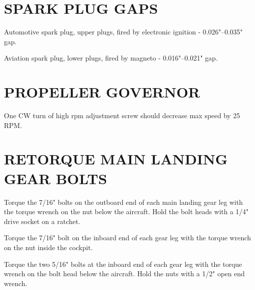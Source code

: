 \section{SPARK PLUG GAPS}
Automotive spark plug, upper plugs, fired by electronic ignition - 0.026"--0.035" gap.

Aviation spark plug, lower plugs, fired by magneto - 0.016"--0.021" gap.

\section{PROPELLER GOVERNOR}
One CW turn of high rpm adjustment screw should decrease max speed by 25 RPM. 

\section{RETORQUE MAIN LANDING GEAR BOLTS}
  \begin{enumerate*}
    \item Torque the 7/16" bolts on the outboard end of each main landing gear leg with the torque wrench on the nut below the aircraft.  Hold the bolt heads with a 1/4" drive socket on a ratchet. 
    \item Torque the 7/16" bolt on the inboard end of each gear leg with the torque wrench on the nut inside the cockpit.  
    \item Torque the two 5/16" bolts at the inboard end of each gear leg with the torque wrench on the bolt head below the aircraft.  Hold the nuts with a 1/2" open end wrench.  
\end{enumerate*}

